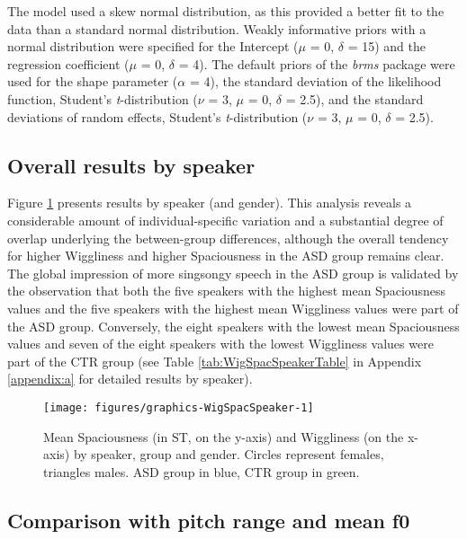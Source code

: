 The model used a skew normal distribution, as this provided a better fit to the data than a standard normal distribution. Weakly informative priors with a normal distribution were specified for the Intercept (\(\mu\) = 0, \(\delta\) = 15) and the regression coefficient (\(\mu\) = 0, \(\delta\) = 4). The default priors of the \emph{brms} package were used for the shape parameter (\(\alpha\) = 4), the standard deviation of the likelihood function, Student's \emph{t}-distribution (\(\nu\) = 3, \(\mu\) = 0, \(\delta\) = 2.5), and the standard deviations of random effects, Student's \emph{t}-distribution (\(\nu\) = 3, \(\mu\) = 0, \(\delta\) = 2.5).

	\subsection{Overall results by speaker}\label{sec:results_overall_speaker}

Figure \ref{fig:WigSpacSpeaker} presents results by speaker (and gender). This analysis reveals a considerable amount of individual-specific variation and a substantial degree of overlap underlying the between-group differences, although the overall tendency for higher Wiggliness and higher Spaciousness in the ASD group remains clear.
The global impression of more singsongy speech in the ASD group is validated by the observation that both the five speakers with the highest mean Spaciousness values and the five speakers with the highest mean Wiggliness values were part of the ASD group. Conversely, the eight speakers with the lowest mean Spaciousness values and seven of the eight speakers with the lowest Wiggliness values were part of the CTR group (see Table \ref{tab:WigSpacSpeakerTable} in Appendix \ref{appendix:a} for detailed results by speaker).



\begin{figure}
	
	{\texttt{[image: figures/graphics-WigSpacSpeaker-1]}
		
	}
	
	\caption{Mean Spaciousness (in ST, on the y-axis) and Wiggliness (on the x-axis) by speaker, group and gender. Circles represent females, triangles males. ASD group in blue, CTR group in green.}\label{fig:WigSpacSpeaker}
\end{figure}

	\subsection{Comparison with pitch range and mean f0}\label{int_results_overall_comparison}

